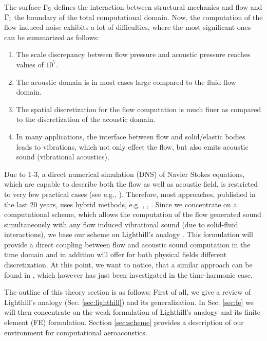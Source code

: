 \documentclass[a4paper,10pt]{article}
\begin{document}
\noindent
The surface  $\Gamma_{\rm S}$  defines the interaction  between structural
mechanics  and  flow  and  $\Gamma_{\rm  I}$ the  boundary  of  the  total
computational  domain. Now,  the  computation of  the  flow induced  noise
exhibits a  lot of  difficulties, where the  most significant ones  can be
summarized as follows:
\smallskip

\begin{enumerate}
\item The  scale discrepancy between  flow pressure and  acoustic pressure
  reaches values of $10^7$.

\item The  acoustic domain is  in most cases  large compared to  the fluid
  flow domain.

\item The spatial discretization for the flow computation is much finer as
  compared to the discretization of the acoustic domain.

\item In  many applications, the interface between  flow and solid/elastic
  bodies leads  to vibrations,  which not only  effect the flow,  but also
  emits acoustic sound (vibrational acoustics).
\end{enumerate}
\smallskip

\noindent
Due  to  1-3,  a  direct  numerical  simulation  (DNS)  of  Navier  Stokes
equations, which are capable to describe both the flow as well as acoustic
field,   is  restricted   to   very  few   practical   cases  (see   e.g.,
\cite{Tam1995a}).  Therefore,  most approaches,  published in the  last 20
years,  uses hybrid  methods,  e.g.  \cite{Tam1995},  \cite{Colonius2000},
\cite{Ewert2001}.   Since we  concentrate on  a  computational scheme,
which allows  the computation of  the flow generated  sound simultaneously
with any flow induced vibrational sound (due to solid-fluid interactions),
we       base      our       scheme      on       Lighthill's      analogy
\cite{Lighthill1952,Lighthill1954}. This formulation will provide a direct
coupling between  flow and acoustic  sound computation in the  time domain
and   in  addition  will   offer  for   both  physical   fields  different
discretization.  At this point, we want to notice, that a similar approach
can  be   found  in  \cite{Oberai2000},   which  however  has   just  been
investigated in the time-harmonic case.

The outline of this theory section is  as follows: First of all, we give a
review   of  Lighthill's  analogy   (Sec.  \ref{sec:lighthill})   and  its
generalization.  In Sec. \ref{sec:fe} we will then concentrate on the weak
formulation   of  Lighthill's   analogy  and   its  finite   element  (FE)
formulation.   Section  \ref{sec:scheme}  provides  a description  of  our
environment for computational aeroacoustics.
\end{document}
